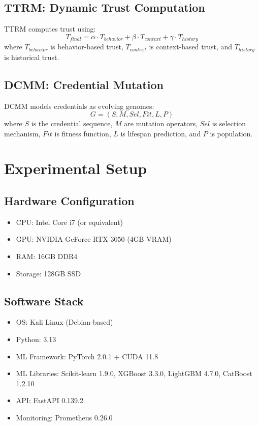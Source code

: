 \documentclass[conference]{IEEEtran}
\begin{document}
\subsection{TTRM: Dynamic Trust Computation}
TTRM computes trust using:
\begin{equation}
    T_{final} = \alpha \cdot T_{behavior} + \beta \cdot T_{context} + \gamma \cdot T_{history}
\end{equation}
where $T_{behavior}$ is behavior-based trust, $T_{context}$ is context-based trust, and $T_{history}$ is historical trust.

\subsection{DCMM: Credential Mutation}
DCMM models credentials as evolving genomes:
\begin{equation}
    G = (S, M, Sel, Fit, L, P)
\end{equation}
where $S$ is the credential sequence, $M$ are mutation operators, $Sel$ is selection mechanism, $Fit$ is fitness function, $L$ is lifespan prediction, and $P$ is population.

\section{Experimental Setup}
\subsection{Hardware Configuration}
\begin{itemize}
    \item CPU: Intel Core i7 (or equivalent)
    \item GPU: NVIDIA GeForce RTX 3050 (4GB VRAM)
    \item RAM: 16GB DDR4
    \item Storage: 128GB SSD
\end{itemize}

\subsection{Software Stack}
\begin{itemize}
    \item OS: Kali Linux (Debian-based)
    \item Python: 3.13
    \item ML Framework: PyTorch 2.0.1 + CUDA 11.8
    \item ML Libraries: Scikit-learn 1.9.0, XGBoost 3.3.0, LightGBM 4.7.0, CatBoost 1.2.10
    \item API: FastAPI 0.139.2
    \item Monitoring: Prometheus 0.26.0
\end{itemize}
\end{document}
